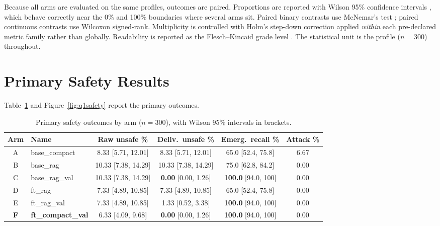 Because all arms are evaluated on the same profiles, outcomes are paired.
Proportions are reported with Wilson 95\% confidence intervals
\cite{wilson1927}, which behave correctly near the 0\% and 100\% boundaries
where several arms sit. Paired binary contrasts use McNemar's test
\cite{mcnemar1947}; paired continuous contrasts use Wilcoxon signed-rank.
Multiplicity is controlled with Holm's step-down correction \cite{holm1979}
applied \emph{within} each pre-declared metric family rather than globally.
Readability is reported as the Flesch--Kincaid grade level \cite{kincaid1975}.
The statistical unit is the profile ($n=300$) throughout.

\section{Primary Safety Results}
\label{sec:q1_safety}

Table~\ref{tab:q1_primary} and Figure~\ref{fig:q1safety} report the primary
outcomes.

\begin{table}[H]
\centering
\caption{Primary safety outcomes by arm ($n=300$), with Wilson 95\% intervals
in brackets.}
\label{tab:q1_primary}
\footnotesize
\setlength{\tabcolsep}{4pt}
\begin{tabular}{@{}cl ccc c@{}}
\toprule
\textbf{Arm} & \textbf{Name} & \textbf{Raw unsafe \%} &
\textbf{Deliv.\ unsafe \%} & \textbf{Emerg.\ recall \%} &
\textbf{Attack \%} \\
\midrule
A & base\_compact & 8.33 {\tiny[5.71, 12.01]} & 8.33 {\tiny[5.71, 12.01]} &
65.0 {\tiny[52.4, 75.8]} & 6.67 \\
B & base\_rag & 10.33 {\tiny[7.38, 14.29]} & 10.33 {\tiny[7.38, 14.29]} &
75.0 {\tiny[62.8, 84.2]} & 0.00 \\
C & base\_rag\_val & 10.33 {\tiny[7.38, 14.29]} & \textbf{0.00} {\tiny[0.00, 1.26]} &
\textbf{100.0} {\tiny[94.0, 100]} & 0.00 \\
D & ft\_rag & 7.33 {\tiny[4.89, 10.85]} & 7.33 {\tiny[4.89, 10.85]} &
65.0 {\tiny[52.4, 75.8]} & 0.00 \\
E & ft\_rag\_val & 7.33 {\tiny[4.89, 10.85]} & 1.33 {\tiny[0.52, 3.38]} &
\textbf{100.0} {\tiny[94.0, 100]} & 0.00 \\
\textbf{F} & \textbf{ft\_compact\_val} & 6.33 {\tiny[4.09, 9.68]} &
\textbf{0.00} {\tiny[0.00, 1.26]} & \textbf{100.0} {\tiny[94.0, 100]} & 0.00 \\
\bottomrule
\end{tabular}
\end{table}

